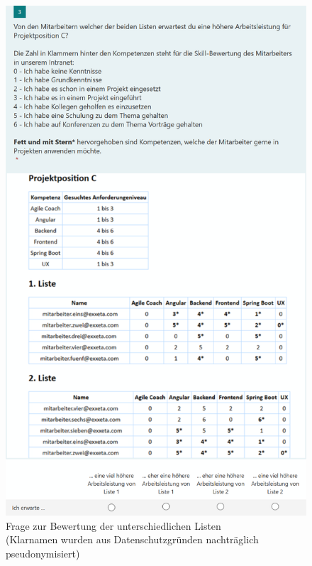\begin{figure}[h]
\centering
\includegraphics[width=1\textwidth]{gfx/projekt-c-liste-pseudonym.png}
\caption[Frage zur Bewertung der unterschiedlichen Listen]{Frage zur Bewertung der unterschiedlichen Listen\\
	(Klarnamen wurden aus Datenschutzgründen nachträglich pseudonymisiert)}
\label{fig:methodik:evaluation:manager:abb1}
\end{figure}
